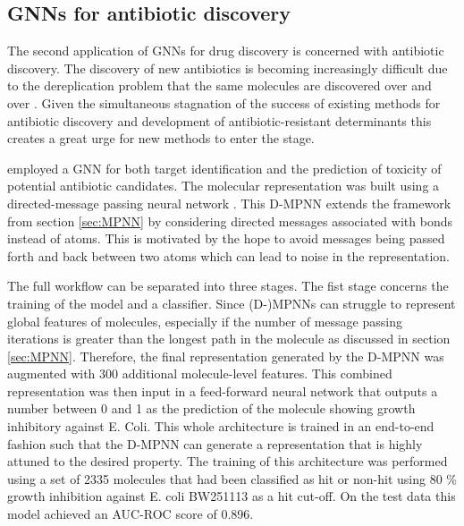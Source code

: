 \subsection{GNNs for antibiotic discovery}
The second application of GNNs for drug discovery is concerned with antibiotic discovery. The discovery of new antibiotics is becoming increasingly difficult due to the dereplication problem that the same molecules are discovered over and over \citep{COX201798}. Given the simultaneous stagnation of the success of existing methods for antibiotic discovery and development of antibiotic-resistant determinants this creates a great urge for new methods to enter the stage.  

\cite{STOKES2020688} employed a GNN for both target identification and the prediction of toxicity of potential antibiotic candidates. The molecular representation was built using a directed-message passing neural network \cite{yangMPP}. This D-MPNN extends the framework from section \ref{sec:MPNN} by considering directed messages associated with bonds instead of atoms. This is motivated by the hope to avoid messages being passed forth and back between two atoms which can lead to noise in the representation.

The full workflow can be separated into three stages. The fist stage concerns the training of the model and a classifier.
Since (D-)MPNNs can struggle to represent global features of molecules, especially if the number of message passing iterations is greater than the longest path in the molecule as discussed in section \ref{sec:MPNN}. Therefore, the final representation generated by the D-MPNN was augmented with 300 additional molecule-level features. This combined representation was then input in a feed-forward neural network that outputs a number between 0 and 1 as the prediction of the molecule showing growth inhibitory against E. Coli. This whole architecture is trained in an end-to-end fashion such that the D-MPNN can generate a representation that is highly attuned to the desired property.
The training of this architecture was performed using a set of 2335 molecules that had been classified as hit or non-hit using 80 \% growth inhibition against E. coli BW251113 \cite{ZAMPIERI20171214} as a hit cut-off. On the test data this model achieved an AUC-ROC score of 0.896.

